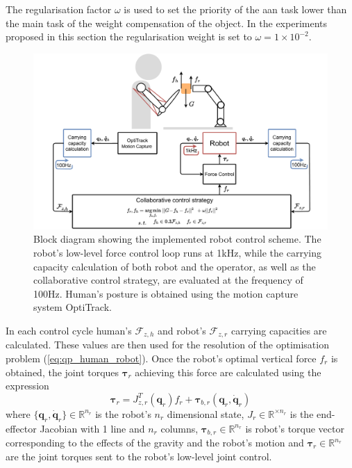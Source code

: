 The regularisation factor $\omega$ is used to set the priority of the \gls{aan} task lower than the main task of the weight compensation of the object. In the experiments proposed in this section the regularisation weight is set to $\omega=1\times 10^{-2}$.


\begin{figure}[!b]
    \centering
    \includegraphics[width=\linewidth]{Papers/images/schema_human_robot.pdf}
    \caption{Block diagram showing the implemented robot control scheme. The robot's low-level force control loop runs at 1kHz, while the carrying capacity calculation of both robot and the operator, as well as the collaborative control strategy, are evaluated at the frequency of 100Hz. Human's posture is obtained using the motion capture system OptiTrack.}
    \label{fig:schema_human_robot_control}
\end{figure}

In each control cycle human's $\mathcal{F}_{z,h}$ and robot's $\mathcal{F}_{z,r}$ carrying capacities are calculated. These values are then used for the resolution of the optimisation problem (\ref{eq:qp_human_robot}). Once the robot's optimal vertical force $f_{r}$ is obtained, the joint torques $\bm{\tau}_{r}$ achieving this force are calculated using the expression
$$
\bm{\tau}_r = J_{z,r}^T(\bm{q}_r) f_r + \bm{\tau}_{b,r}(\bm{q}_r,\dot{\bm{q}}_r)
$$
where $\{\bm{q}_r,\dot{\bm{q}}_r\}\in \mathbb{R}^{n_r}$ is the robot's $n_r$ dimensional state, $J_r\in\mathbb{R}^{\times n_r}$ is the end-effector Jacobian with 1 line and $n_r$ columns, $\bm{\tau}_{b,r} \in\mathbb{R}^{n_r}$ is robot's torque vector corresponding to the effects of the gravity and the robot's motion and $\bm{\tau}_r \in\mathbb{R}^{n_r}$ are the joint torques sent to the robot's low-level joint control. 


